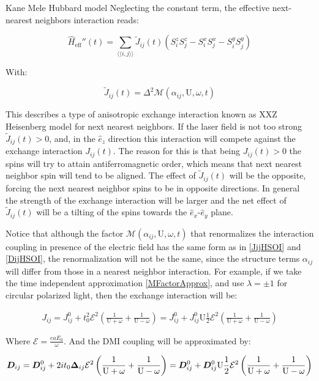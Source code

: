 \begin{section}{Kane Mele Hubbard model}
Neglecting the constant term, the effective next-nearest neighbors interaction reads:

\begin{equation}
\hat{H}_{\text{eff}}''(t) = \sum_{\langle \langle i,j \rangle \rangle} \tilde{J}_{ij}(t) (S_i^zS_j^z - S_i^xS_j^x - S_i^yS_j^y)
\end{equation}

With:

\begin{equation}
\tilde{J}_{ij}(t) = \Delta^2 \mathcal{M}(\alpha_{ij}, \text{U}, \omega, t)
\end{equation}

This describes a type of anisotropic exchange interaction known as XXZ Heisenberg model for next nearest neighbors. If the laser field is not too strong $\tilde{J}_{ij}(t) > 0$, and, in the $\hat{e}_z$ direction this interaction will compete against the exchange interaction $J_{ij}(t)$. The reason for this is that being $J_{ij}(t) > 0$ the spins will try to attain antiferromagnetic order, which means that next nearest neighbor spin will tend to be aligned. The effect of $\tilde{J}_{ij}(t)$ will be the opposite, forcing the next nearest neighbor spins to be in opposite directions. In general the strength of the exchange interaction will be larger and the net effect of $\tilde{J}_{ij}(t)$ will be a tilting of the spins towards the $\hat{e}_x$-$\hat{e}_y$ plane.

Notice that although the factor $\mathcal{M}(\alpha_{ij}, \text{U}, \omega, t)$ that renormalizes the interaction coupling in presence of the electric field has the same form as in \ref{JijHSOI} and \ref{DijHSOI}, the renormalization will not be the same, since the structure terms $\alpha_{ij}$ will differ from those in a nearest neighbor interaction. For example, if we take the time independent approximation \ref{MFactorApprox}, and use $\lambda = \pm 1$ for circular polarized light, then the exchange interaction will be:

\begin{align*}
J_{ij} = J_{ij}^0 + t_0^2 \mathcal{E}^2 \left( \frac{1}{\text{U}+\omega} + \frac{1}{\text{U}-\omega} \right) = J_{ij}^0 + J_{ij}^0 \text{U}\frac{1}{2} \mathcal{E}^2 \left( \frac{1}{\text{U}+\omega} + \frac{1}{\text{U}-\omega} \right)
\end{align*}

Where $\mathcal{E} = \frac{eaE_0}{\omega}$. And the DMI coupling will be approximated by:

\begin{align*}
\boldsymbol{D}_{ij} = \boldsymbol{D}_{ij}^0 + 2it_0\boldsymbol{\Delta}_{ij}  \mathcal{E}^2 \left( \frac{1}{\text{U}+\omega} + \frac{1}{\text{U}-\omega} \right) = \boldsymbol{D}_{ij}^0 + \boldsymbol{D}_{ij}^0 \text{U}\frac{1}{2} \mathcal{E}^2 \left( \frac{1}{\text{U}+\omega} + \frac{1}{\text{U}-\omega} \right)
\end{align*}


\end{section}
